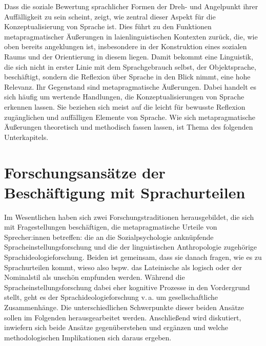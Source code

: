 Dass die soziale Bewertung sprachlicher Formen der Dreh- und Angelpunkt ihrer Auffälligkeit zu sein scheint, zeigt, wie zentral dieser Aspekt für die Konzeptualisierung von Sprache ist. 
Dies führt zu den Funktionen metapragmatischer Äußerungen in laienlinguistischen Kontexten zurück, die, wie oben bereits angeklungen ist, insbesondere in der Konstruktion eines sozialen Raums und der Orientierung in diesem liegen. 
Damit bekommt eine Linguistik, die sich nicht in erster Linie mit dem Sprachgebrauch selbst, der Objektsprache, beschäftigt, sondern die Reflexion über Sprache in den Blick nimmt, eine hohe Relevanz. 
Ihr Gegenstand sind metapragmatische Äußerungen. 
Dabei handelt es sich häufig um wertende Handlungen, die Konzeptualisierungen von Sprache erkennen lassen. 
Sie beziehen sich meist auf die leicht für bewusste Reflexion zugänglichen und auffälligen Elemente von Sprache. 
Wie sich metapragmatische Äußerungen theoretisch und methodisch fassen lassen, ist Thema des folgenden Unterkapitels. 
\section{Forschungsansätze der Beschäftigung mit Sprachurteilen}
\label{sec: Forschungsansaetze}
Im Wesentlichen haben sich zwei Forschungstraditionen herausgebildet, die sich mit Fragestellungen beschäftigen, die metapragmatische Urteile von Sprecher:innen betreffen: die an die Sozialpsychologie \citep[für einen Überblick hierzu s.][]{Graumann.2005} anknüpfende Spracheinstellungsforschung und die der linguistischen Anthropologie \citep[für einen Überblick s.][]{Wortham.2008} zugehörige Sprachideologieforschung. 
Beiden ist gemeinsam, dass sie danach fragen, wie es zu Sprachurteilen kommt, wieso also bspw. das Lateinische als logisch oder der Nominalstil als unschön empfunden werden. 
Während die Spracheinstellungsforschung dabei eher kognitive Prozesse in den Vordergrund stellt, geht es der Sprachideologieforschung v.\,a. um gesellschaftliche Zusammenhänge. 
Die unterschiedlichen Schwerpunkte dieser beiden Ansätze sollen im Folgenden herausgearbeitet werden. 
Anschließend wird diskutiert, inwiefern sich beide Ansätze gegenüberstehen und ergänzen und welche methodologischen Implikationen sich daraus ergeben. 
